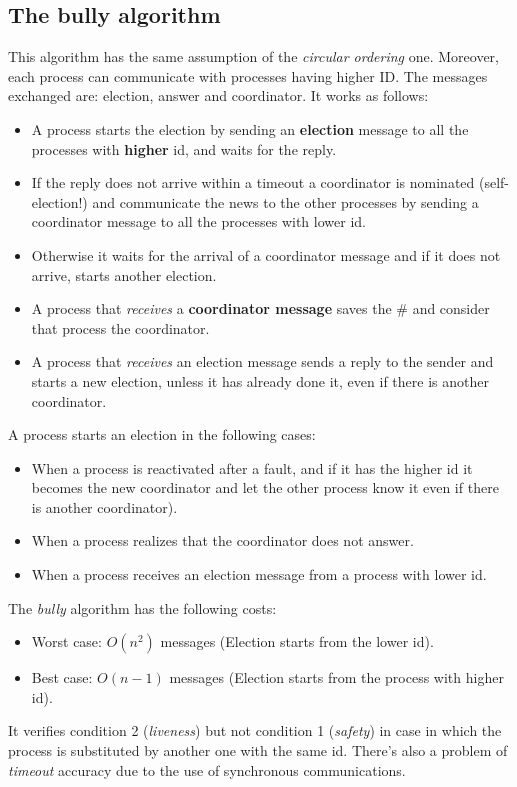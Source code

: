 \subsection{The bully algorithm} 
This algorithm has the same assumption of the \textit{circular ordering} one. Moreover, each process can communicate with processes having higher ID.
The messages exchanged are: election, answer and coordinator. It works as follows:
\begin{itemize}
	\item A process starts the election by sending an \textbf{election} message to all the processes with \textbf{higher} id, and waits for the reply.
	\item If the reply does not arrive within a timeout a coordinator is nominated
	(self-election!) and communicate the news to the other processes by
	sending a coordinator message to all the processes with lower id.
	\item Otherwise it waits for the arrival of a coordinator message and if it does not arrive, starts another election.
	\item A process that \textit{receives} a \textbf{coordinator message} saves the \# and consider that process the coordinator.
	\item A process that \textit{receives} an election message sends a reply to the sender and starts a new election, unless it has already done it, even if there is another coordinator.
\end{itemize}
A process starts an election in the following cases:
\begin{itemize}
	\item When a process is reactivated after a fault, and if it has the higher id it becomes the new coordinator and let the other process know it even if there is another coordinator).
	\item When a process realizes that the coordinator does not answer.
	\item When a process receives an election message from a process with lower id.
\end{itemize}
The \textit{bully} algorithm has the following costs:
\begin{itemize}
	\item Worst case: $O(n^2)$ messages (Election starts from the lower id).
	\item Best case: $O(n-1)$ messages (Election starts from the process with higher id).
\end{itemize}
It verifies condition 2 (\textit{liveness}) but not condition 1 (\textit{safety}) in case in which the process is substituted by another one with the same id. There's also a problem of \textit{timeout} accuracy due to the use of synchronous communications.

